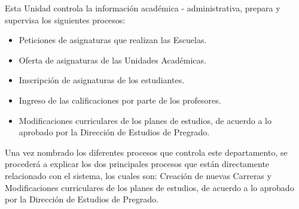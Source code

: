 		
		
		
		
		
		
		Esta Unidad  controla la información académica - administrativa, prepara y supervisa los siguientes procesos:
		\begin{itemize}
			\item Peticiones de asignaturas que realizan las Escuelas.
			\item Oferta de asignaturas de las Unidades Académicas.
			\item Inscripción de asignaturas de los estudiantes.
			\item Ingreso de las calificaciones por parte de los profesores.
			\item Modificaciones curriculares de los planes de estudios, de acuerdo  a lo aprobado por la Dirección de Estudios de Pregrado.
			
		\end{itemize}
		
		
		Una vez nombrado los diferentes procesos que controla este departamento, se procederá a explicar los dos  principales procesos que están directamente relacionado con el sistema, los cuales son: Creación de nuevas Carreras y  Modificaciones curriculares de los planes de estudios, de acuerdo  a lo aprobado por la Dirección de Estudios de Pregrado.
		
		
